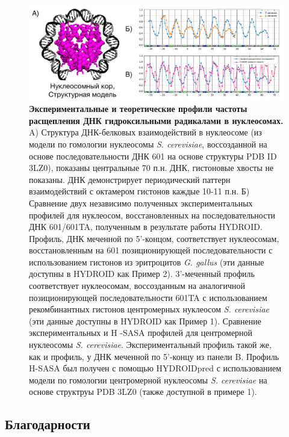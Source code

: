 \begin{figure} [H]
    \centering
    \includegraphics[width=\textwidth]{images/p5/part5_1_np/p5_1_f6.pdf}
    \caption[Экспериментальные и теоретические профили частоты расщепления ДНК гидроксильными радикалами в нуклеосомах]{\textbf{Экспериментальные и теоретические профили частоты расщепления ДНК гидроксильными радикалами в нуклеосомах.} A) Структура ДНК-белковых взаимодействий в нуклеосоме (из модели по гомологии нуклеосомы \textit{S. cerevisiae}, воссозданной на основе последовательности ДНК 601 на основе структуры PDB ID 3LZ0), показаны центральные 70 п.н. ДНК, гистоновые хвосты не показаны. ДНК демонстрирует периодический паттерн взаимодействий с октамером гистонов каждые 10-11 п.н. Б) Сравнение двух независимо полученных экспериментальных профилей для нуклеосом, восстановленных на последовательности ДНК 601/601TA, полученным в результате работы HYDROID. Профиль, ДНК меченной по 5'-концом, соответствует нуклеосомам, восстановленным на 601 позиционирующей последовательности с использованием гистонов из эритроцитов \textit{G. gallus} (эти данные доступны в HYDROID как Пример 2). 3'-меченный профиль соответствует нуклеосомам, воссозданным на аналогичной позиционирующей последовательности 601TA с использованием рекомбинантных гистонов центромерных нуклеосом \textit{S. cerevisiae} (эти данные доступны в HYDROID как Пример 1). Сравнение экспериментальных и H -SASA профилей для центромерной нуклеосомы \textit{S. cerevisiae}. Экспериментальный профиль такой же, как и профиль, у ДНК меченной по 5'-концу из панели B. Профиль H-SASA был получен с помощью HYDROIDpred с использованием модели  по гомологии центромерной нуклеосомы \textit{S. cerevisiae} на основе структруы PDB 3LZ0 (также доступной в примере 1).}
    \label{fig:p5_1_f6}
\end{figure}
    
    
    \subsection{Благодарности}

